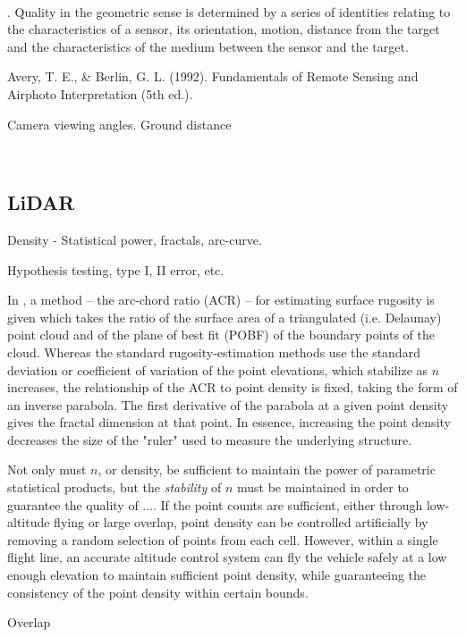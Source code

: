 ~~~

 \cite{Gupta2018}. 
Quality in the geometric sense is determined by a series of identities relating to the characteristics of a sensor, its orientation, motion, distance from the target and the characteristics of the medium between the sensor and the target.

\cite{Avery1992}
Avery, T. E., \& Berlin, G. L. (1992). Fundamentals of Remote Sensing and Airphoto Interpretation (5th ed.).

Camera viewing angles.
Ground distance

~~~



\subsection{LiDAR}

Density - Statistical power, fractals, arc-curve.

Hypothesis testing, type I, II error, etc.

In \cite{DuPreez2014}, a method -- the arc-chord ratio (ACR) -- for estimating surface rugosity is given which takes the ratio of the surface area of a triangulated (i.e. Delaunay) point cloud and of the plane of best fit (POBF) of the boundary points of the cloud. Whereas the standard rugosity-estimation methods use the standard deviation or coefficient of variation of the point elevations, which stabilize as $n$ increases, the relationship of the ACR to point density is fixed, taking the form of an inverse parabola. The first derivative of the parabola at a given point density gives the fractal dimension at that point. In essence, increasing the point density decreases the size of the "ruler" used to measure the underlying structure.

Not only must $n$, or density, be sufficient to maintain the power of parametric statistical products, but the \emph{stability} of $n$ must be maintained in order to guarantee the quality of .... If the point counts are sufficient, either through low-altitude flying or large overlap, point density can be controlled artificially by removing a random selection of points from each cell. However, within a single flight line, an accurate altitude control system can fly the vehicle safely at a low enough elevation to maintain sufficient point density, while guaranteeing the consistency of the point density within certain bounds.



Overlap

